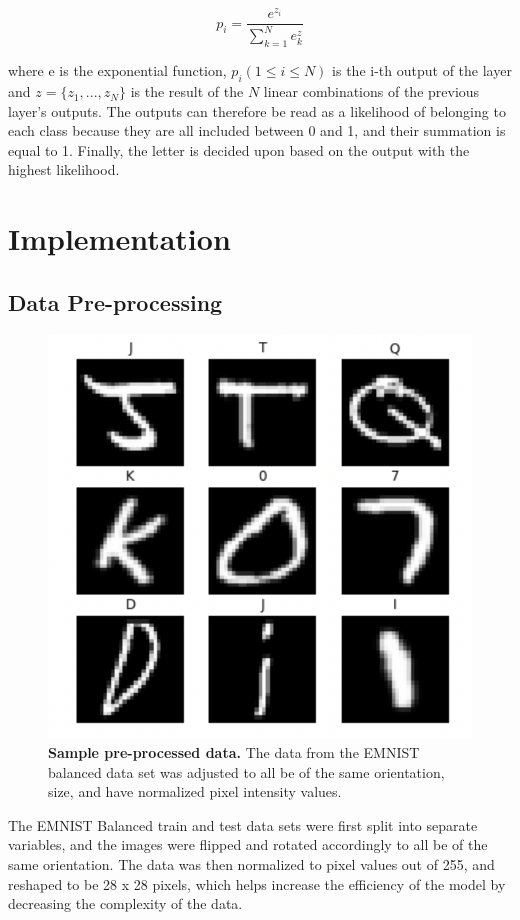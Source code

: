 \documentclass[conference]{IEEEtran}
\begin{document}
\[ p_i = \frac{e^{z_i}}{\sum_{k=1}^{N} e^z_k}\]

where e is the exponential function, \( p_i (1 \leq i \leq N) \) is the i-th output of the layer and \( z = \{z_1, ..., z_N \} \) is the result of the \( N \) linear combinations of the previous layer’s outputs. The outputs can therefore be read as a likelihood of belonging to each class because they are all included between 0 and 1, and their summation is equal to 1. Finally, the letter is decided upon based on the output with the highest likelihood.

\section{Implementation}

\subsection{Data Pre-processing}
\begin{figure}[h!]
\centering
\includegraphics[width=1\linewidth]{images/sample.jpg}
\caption{\textbf{Sample pre-processed data.} The data from the EMNIST balanced data set was adjusted to all be of the same orientation, size, and have normalized pixel intensity values. }
\label{fig:cnn}
\end{figure}
The EMNIST Balanced train and test data sets were first split into separate variables, and the images were flipped and rotated accordingly to all be of the same orientation. The data was then normalized to pixel values out of 255, and reshaped to be 28 x 28 pixels, which helps increase the efficiency of the model by decreasing the complexity of the data. 
\end{document}
